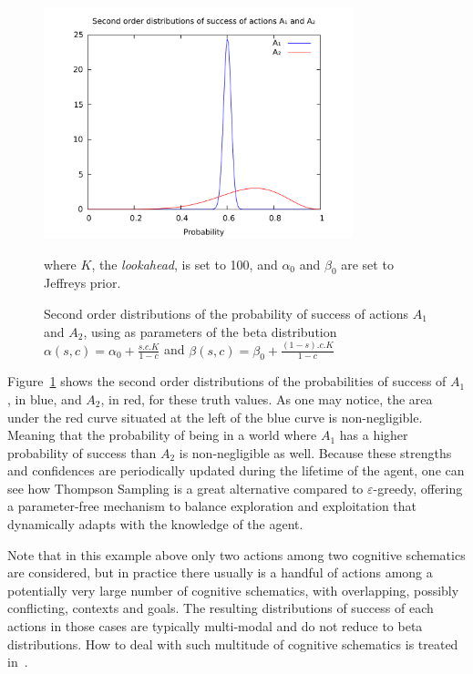 \documentclass[runningheads]{llncs}
\begin{document}
\begin{figure}
  \centerline{\includegraphics[width=0.8\textwidth]{pictures/actiondist.pdf}}
  \caption{Second order distributions of the probability of success of
    actions $A_1$ and $A_2$, using as parameters of the beta
    distribution $\alpha(s, c)=\alpha_0 + \frac{s.c.K}{1-c}$ and
    $\beta(s, c)=\beta_0 + \frac{(1-s).c.K}{1-c}$} where $K$, the
  \emph{lookahead}, is set to 100, and $\alpha_0$ and $\beta_0$ are
  set to Jeffreys prior.
  \label{fig:actiondist}
\end{figure}
Figure~\ref{fig:actiondist} shows the second order distributions of
the probabilities of success of $A_1$, in blue, and $A_2$, in red, for
these truth values.  As one may notice, the area under the red curve
situated at the left of the blue curve is non-negligible.  Meaning
that the probability of being in a world where $A_1$ has a higher
probability of success than $A_2$ is non-negligible as well.  Because
these strengths and confidences are periodically updated during the
lifetime of the agent, one can see how Thompson Sampling is a great
alternative compared to $\varepsilon$-greedy, offering a
parameter-free mechanism to balance exploration and exploitation that
dynamically adapts with the knowledge of the agent.

Note that in this example above only two actions among two cognitive
schematics are considered, but in practice there usually is a handful
of actions among a potentially very large number of cognitive
schematics, with overlapping, possibly conflicting, contexts and
goals.  The resulting distributions of success of each actions in
those cases are typically multi-modal and do not reduce to beta
distributions.  How to deal with such multitude of cognitive
schematics is treated in~\cite{Geisweiller2018}.
\end{document}

